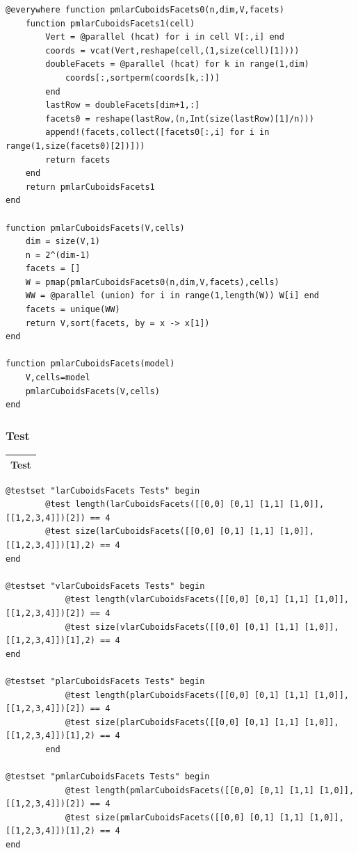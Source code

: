 \documentclass{article}
\begin{document}
\begin{flushleft}
\begin{list}{}{} \item
   \begin{Verbatim}[tabsize=4]
@everywhere function pmlarCuboidsFacets0(n,dim,V,facets)
	function pmlarCuboidsFacets1(cell)
		Vert = @parallel (hcat) for i in cell V[:,i] end
		coords = vcat(Vert,reshape(cell,(1,size(cell)[1])))
		doubleFacets = @parallel (hcat) for k in range(1,dim) 
		    coords[:,sortperm(coords[k,:])] 
		end
		lastRow = doubleFacets[dim+1,:]
		facets0 = reshape(lastRow,(n,Int(size(lastRow)[1]/n)))
		append!(facets,collect([facets0[:,i] for i in range(1,size(facets0)[2])]))
		return facets
	end
	return pmlarCuboidsFacets1
end

function pmlarCuboidsFacets(V,cells)
	dim = size(V,1)
	n = 2^(dim-1)
	facets = []
	W = pmap(pmlarCuboidsFacets0(n,dim,V,facets),cells)
	WW = @parallel (union) for i in range(1,length(W)) W[i] end
	facets = unique(WW)
	return V,sort(facets, by = x -> x[1])
end

function pmlarCuboidsFacets(model)
    V,cells=model
    pmlarCuboidsFacets(V,cells)
end
   \end{Verbatim}
\end{list}
\end{flushleft}
\subsubsection{Test}
\begin{center}
\begin{tabular}{|p{16cm}|}
\hline
\cellcolor[gray]{.9}Test\\
\hline
\end{tabular}
\end{center}

\begin{flushleft}\small
\begin{list}{}{} \item
    \begin{Verbatim}[tabsize=4]
@testset "larCuboidsFacets Tests" begin
		@test length(larCuboidsFacets([[0,0] [0,1] [1,1] [1,0]], [[1,2,3,4]])[2]) == 4
		@test size(larCuboidsFacets([[0,0] [0,1] [1,1] [1,0]], [[1,2,3,4]])[1],2) == 4 
end
	
@testset "vlarCuboidsFacets Tests" begin
		    @test length(vlarCuboidsFacets([[0,0] [0,1] [1,1] [1,0]], [[1,2,3,4]])[2]) == 4
		    @test size(vlarCuboidsFacets([[0,0] [0,1] [1,1] [1,0]], [[1,2,3,4]])[1],2) == 4 
end

@testset "plarCuboidsFacets Tests" begin
		    @test length(plarCuboidsFacets([[0,0] [0,1] [1,1] [1,0]], [[1,2,3,4]])[2]) == 4
    		@test size(plarCuboidsFacets([[0,0] [0,1] [1,1] [1,0]], [[1,2,3,4]])[1],2) == 4 
    	end
	
@testset "pmlarCuboidsFacets Tests" begin
    		@test length(pmlarCuboidsFacets([[0,0] [0,1] [1,1] [1,0]], [[1,2,3,4]])[2]) == 4
    		@test size(pmlarCuboidsFacets([[0,0] [0,1] [1,1] [1,0]], [[1,2,3,4]])[1],2) == 4 
end
   \end{Verbatim}
\end{list}
\end{flushleft}
\end{document}
